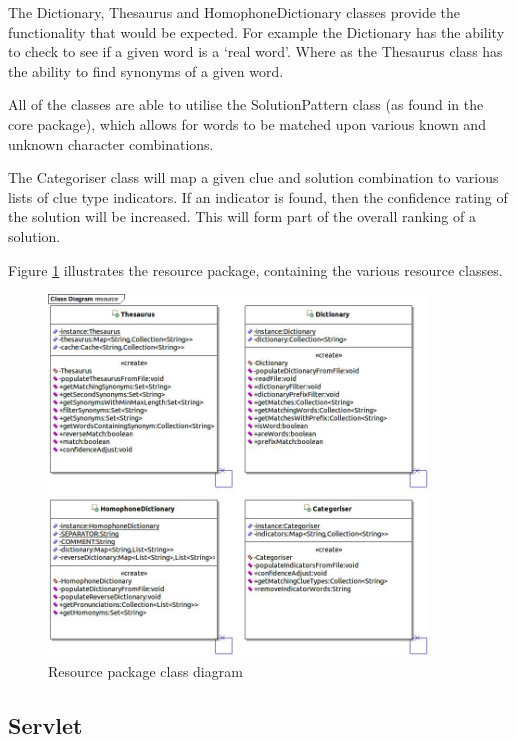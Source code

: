 The Dictionary, Thesaurus and HomophoneDictionary classes provide the 
functionality that would be expected. For example the Dictionary has the ability
to check to see if a given word is a `real word'. Where as the Thesaurus class
has the ability to find synonyms of a given word.

All of the classes are able to utilise the SolutionPattern class (as found in 
the core package), which allows for words to be matched upon various known and 
unknown character combinations.

The Categoriser class will map a given clue and solution combination to various 
lists of clue type indicators. If an indicator is found, then the confidence 
rating of the solution will be increased. This will form part of the overall 
ranking of a solution.

Figure \ref{fig:resource_package} illustrates the resource package, containing 
the various resource classes.

\begin{figure}[H]
  \centering
  \includegraphics[width=0.9\textwidth]{design/class/resource.jpg}
  \caption{Resource package class diagram}
  \label{fig:resource_package}
\end{figure}


\subsection{Servlet}
\label{sub:servlet}

